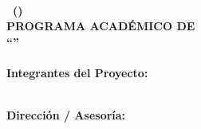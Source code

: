 
\begin{titlepage}
\thispagestyle{empty}

\begin{center}
    {\fontsize{15}{18}\bfseries\sffamily \institucionNombre}\\[0.4em]
    {\fontsize{11}{14}\bfseries\sffamily \unidadAcademica\ (\siglasUnidad)}\\[0.3em]
    {\fontsize{12}{15}\bfseries\sffamily PROGRAMA ACADÉMICO DE \programaAcademico}\\[0.8em]

    {\fontsize{14}{17}\bfseries\sffamily ``\tituloProyecto''}\\[0.5em]
    {\fontsize{11}{14}\bfseries\sffamily \subtituloPortada}\\[1.0em]

    {\fontsize{11}{14}\bfseries\sffamily Integrantes del Proyecto:}\\[0.2em]
    \noindent
    \begin{minipage}{\textwidth}
        \centering
    \end{minipage}\\[1.2em]

    {\fontsize{11}{14}\bfseries\sffamily Dirección / Asesoría:}\\[0.2em]
    \noindent
    \begin{minipage}{\textwidth}
        \centering
    \end{minipage}\\[1.2em]


\end{center}
\end{titlepage}
